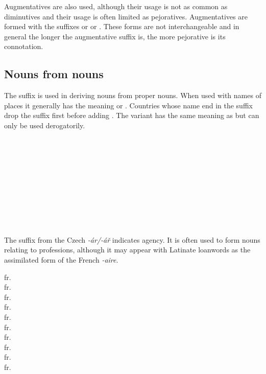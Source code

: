 Augmentatives are also used, although their usage is not as common as diminutives and their usage is often limited as pejoratives. Augmentatives are formed with the suffixes  or  or . These forms are not interchangeable and in general the longer the augmentative suffix is, the more pejorative is its connotation.

\subsection{Nouns from nouns}

The suffix  is used in deriving nouns from proper nouns. When used with names of places it generally has the meaning  or . Countries whose name end in the suffix  drop the suffix first before adding . The variant  has the same meaning as  but can only be used derogatorily.

\begin{multicols}{2}
  \ex
  \\
  \\
  \\
  \\
  \\
  \\
  \\
  \\
  \\
  \xe
\end{multicols}


The suffix  from the Czech \emph{-ár/-ář} indicates agency. It is often used to form nouns relating to professions, although it may appear with Latinate loanwords as the assimilated form of the French \emph{-aire}.

\ex
{} fr. \\
 fr. \\
 fr. \\
 fr. \\
 fr. \\
 fr. \\
 fr. \\
 fr. \\
 fr. \\
 fr. 
\xe

